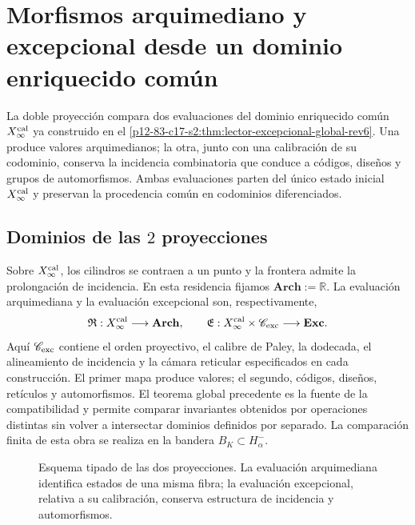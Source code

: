 \label{chap:83-17}

\section{Morfismos arquimediano y excepcional desde un dominio enriquecido común}
\label{p12-83-c17-s1:chap:doble}

La doble proyección compara dos evaluaciones del dominio enriquecido común
\(X_\infty^{\rm cal}\) ya construido en el
\cref{p12-83-c17-s2:thm:lector-excepcional-global-rev6}. Una produce valores
arquimedianos; la otra, junto con una calibración de su codominio, conserva
la incidencia combinatoria que conduce a códigos, diseños y grupos de
automorfismos. Ambas evaluaciones parten del único estado inicial
\(X_\infty^{\rm cal}\) y preservan la procedencia común en codominios
diferenciados.

\subsection{Dominios de las \(2\) proyecciones}

Sobre \(X_\infty^{\rm cal}\), los cilindros se contraen a un punto y la
frontera admite la prolongación de incidencia. En esta residencia fijamos
\(\mathbf{Arch}:=\mathbb R\). La evaluación arquimediana y la evaluación
excepcional son, respectivamente,
\[
\mathfrak R:X_\infty^{\rm cal}\longrightarrow\mathbf{Arch},
\qquad
\mathfrak E:X_\infty^{\rm cal}\times\mathscr C_{\rm exc}
\longrightarrow\mathbf{Exc}.
\]
Aquí \(\mathscr C_{\rm exc}\) contiene el orden proyectivo, el calibre de
Paley, la dodecada, el alineamiento de incidencia y la cámara reticular
especificados en cada construcción. El primer mapa produce valores; el
segundo, códigos, diseños, retículos y automorfismos. El teorema global
precedente es la fuente de la compatibilidad y permite comparar
invariantes obtenidos por operaciones distintas sin volver a intersectar
dominios definidos por separado. La comparación finita de esta obra se
realiza en la bandera
\(B_K\subset H^-_\alpha\).

\begin{figure}[H]
\centering
\resizebox{\textwidth}{!}{}
\caption{Esquema tipado de las dos proyecciones. La evaluación arquimediana
identifica estados de una misma fibra; la evaluación excepcional, relativa
a su calibración, conserva estructura de incidencia y automorfismos.}
\label{p12-83-c17-s1:fig:doble-proyeccion}
\end{figure}

